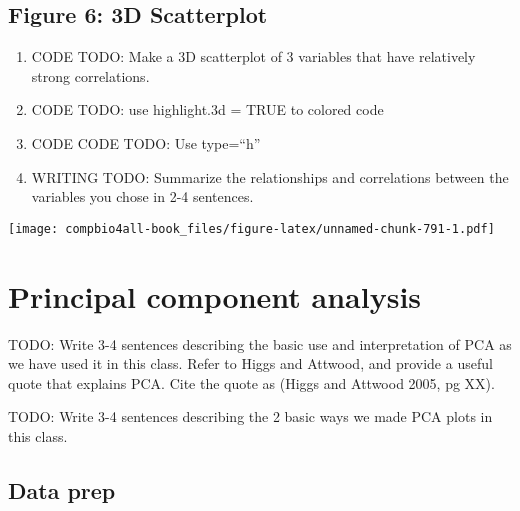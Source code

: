 \documentclass[
]{book}
\newenvironment{Shaded}{\begin{snugshade}}{\end{snugshade}}
\newcommand{\AttributeTok}[1]{\textcolor[rgb]{0.77,0.63,0.00}{#1}}
\newcommand{\ConstantTok}[1]{\textcolor[rgb]{0.00,0.00,0.00}{#1}}
\newcommand{\FunctionTok}[1]{\textcolor[rgb]{0.00,0.00,0.00}{#1}}
\newcommand{\NormalTok}[1]{#1}
\newcommand{\SpecialCharTok}[1]{\textcolor[rgb]{0.00,0.00,0.00}{#1}}
\newcommand{\StringTok}[1]{\textcolor[rgb]{0.31,0.60,0.02}{#1}}
\providecommand{\tightlist}{%
  \setlength{\itemsep}{0pt}\setlength{\parskip}{0pt}}
\begin{document}
\hypertarget{figure-6-3d-scatterplot-1}{%
\subsection{Figure 6: 3D Scatterplot}\label{figure-6-3d-scatterplot-1}}

\begin{enumerate}
\def\labelenumi{\arabic{enumi}.}
\tightlist
\item
  CODE TODO: Make a 3D scatterplot of 3 variables that have relatively strong correlations.
\item
  CODE TODO: use highlight.3d = TRUE to colored code
\item
  CODE CODE TODO: Use type=``h''
\item
  WRITING TODO: Summarize the relationships and correlations between the variables you chose in 2-4 sentences.
\end{enumerate}

\begin{Shaded}
\end{Shaded}

\texttt{[image: compbio4all-book\_files/figure-latex/unnamed-chunk-791-1.pdf]}

\hypertarget{principal-component-analysis-1}{%
\section{Principal component analysis}\label{principal-component-analysis-1}}

TODO: Write 3-4 sentences describing the basic use and interpretation of PCA as we have used it in this class. Refer to Higgs and Attwood, and provide a useful quote that explains PCA. Cite the quote as (Higgs and Attwood 2005, pg XX).

TODO: Write 3-4 sentences describing the 2 basic ways we made PCA plots in this class.

\hypertarget{data-prep-1}{%
\subsection{Data prep}\label{data-prep-1}}
\end{document}
